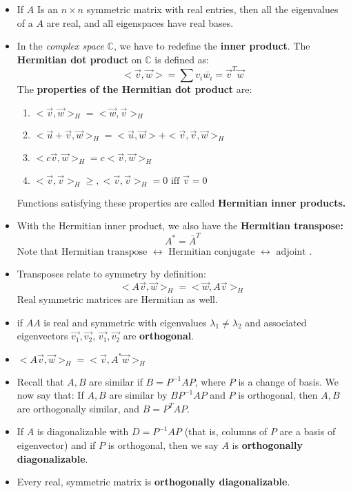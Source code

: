 \documentclass[10pt,letterpaper]{article}
\begin{document}
\begin{itemize}
\item If $A$ Is an $n \times n$ symmetric matrix with real entries, then all the eigenvalues of a $A$ are real, and all eigenspaces have real bases. 

\item In the \textit{complex space }$\mathbb{C}$, we have to redefine the \textbf{inner product}. The \textbf{Hermitian dot product} on $\mathbb{C}$ is defined as: 
$$<\vec{v},\vec{w}>=\sum v_i\bar{w_i}=\vec{v}^T\vec{w}$$
The \textbf{properties of the Hermitian dot product }are: 
\begin{enumerate}
\item $<\vec{v}, \vec{w}>_H=<\vec{w}, \vec{v}>_H$
\item $<\vec{u}+\vec{v},\vec{w}>_H=<\vec{u},\vec{w}>+<\vec{v},\vec{v},\vec{w}>_H$
\item $<c\vec{v},\vec{w}>_H=c<\vec{v},\vec{w}>_H$
\item $<\vec{v},\vec{v}>_H\geq , <\vec{v},\vec{v}>_H=0 \mbox{ iff } \vec{v}=0$
\end{enumerate}
Functions satisfying these properties are called \textbf{Hermitian inner products.}

\item With the Hermitian inner product, we also have the \textbf{Hermitian transpose:}
$$A^*=\bar{A}^T$$ 
Note that $\mbox{Hermitian transpose } \leftrightarrow \mbox{ Hermitian conjugate } \leftrightarrow \mbox{ adjoint }$. 
\item Transposes relate to symmetry by definition: 
$$ <A\vec{v},\vec{w}>_H=<\vec{w},A\vec{v}>_H$$ 
Real symmetric matrices are Hermitian as well. 

\item if $AA$ is real and symmetric with eigenvalues $\lambda_1 \neq \lambda_2$ and associated eigenvectors $\vec{v_1}, \vec{v_2}$, $\vec{v_1}, \vec{v_2}$ are \textbf{orthogonal}. 

\item $<A\vec{v}, \vec{w}>_H=<\vec{v},A^*\vec{w}>_H$

\item Recall that $A, B$ are similar if $B=P^{-1}AP$, where $P$ is a change of basis. We now say that: 
If $A,B$ are similar by $BP^{-1}AP$ and $P$ is orthogonal, then $A, B$ are orthogonally similar, and $B=P^TAP$. 
\item If $A$ is diagonalizable with $D=P^{-1}AP$ (that is, columns of $P$ are a basis of eigenvector) and if $P$ is orthogonal, then we say $A$ is \textbf{orthogonally diagonalizable}. 

\item Every real, symmetric matrix is \textbf{orthogonally diagonalizable}. 
\end{itemize}
\end{document}
